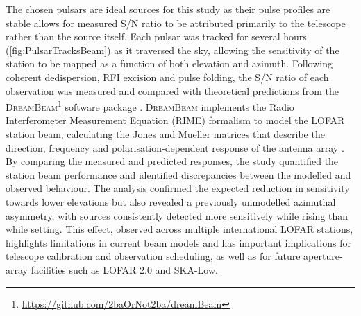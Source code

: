 The chosen pulsars are ideal sources for this study as their pulse profiles are stable allows for measured S/N ratio to be attributed primarily to the telescope rather than the source itself. Each pulsar was tracked for several hours (\cref{fig:PulsarTracksBeam}) as it traversed the sky, allowing the sensitivity of the station to be mapped as a function of both elevation and azimuth. Following coherent dedispersion, RFI excision and pulse folding, the S/N ratio of each observation was measured and compared with theoretical predictions from the \textsc{DreamBeam}\footnote{\url{https://github.com/2baOrNot2ba/dreamBeam}} software package \citep{creaner_beammodeltester_2019}. \textsc{DreamBeam} implements the Radio Interferometer Measurement Equation (RIME) formalism \citep{price_generalized_2015} to model the LOFAR station beam, calculating the Jones and Mueller matrices that describe the direction, frequency and polarisation-dependent response of the antenna array \citep{hamaker_understanding_1996}. By comparing the measured and predicted responses, the study quantified the station beam performance and identified discrepancies between the modelled and observed behaviour. The analysis confirmed the expected reduction in sensitivity towards lower elevations but also revealed a previously unmodelled azimuthal asymmetry, with sources consistently detected more sensitively while rising than while setting. This effect, observed across multiple international LOFAR stations, highlights limitations in current beam models and has important implications for telescope calibration and observation scheduling, as well as for future aperture-array facilities such as LOFAR 2.0 and SKA-Low.




\newpage
